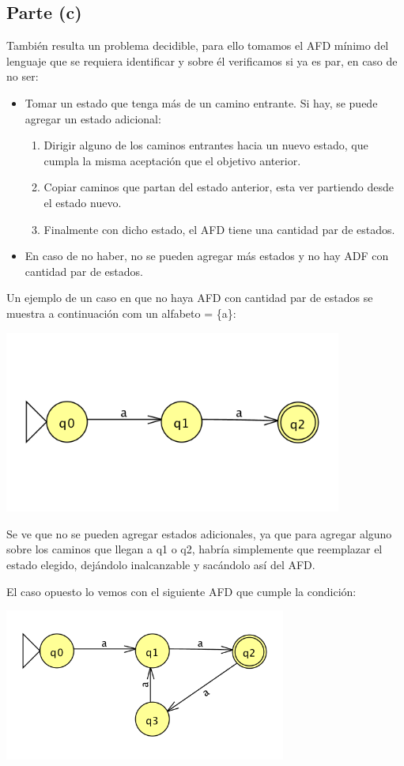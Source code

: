 \documentclass[11pt,letterpaper]{article}
\begin{document}
\subsection{Parte (c)}
También resulta un problema decidible, para ello tomamos el AFD mínimo del lenguaje que se requiera identificar y sobre él verificamos si ya es par, en caso de no ser:
\begin{itemize}
	\item Tomar un estado que tenga más de un camino entrante. Si hay, se puede agregar un estado adicional:
		\begin{enumerate}
			\item Dirigir alguno de los caminos entrantes hacia un nuevo estado, que cumpla la misma aceptación que el objetivo anterior.
			\item Copiar caminos que partan del estado anterior, esta ver partiendo desde el estado nuevo.
			\item Finalmente con dicho estado, el AFD tiene una cantidad par de estados.
		\end{enumerate}
	\item En caso de no haber, no se pueden agregar más estados y no hay ADF con cantidad par de estados.
\end{itemize}

Un ejemplo de un caso en que no haya AFD con cantidad par de estados se muestra a continuación com un alfabeto = \{a\}:
\begin{center}
\includegraphics[height=6cm]{tarea_5-c.png}
\end{center}

Se ve que no se pueden agregar estados adicionales, ya que para agregar alguno sobre los caminos que llegan a q1 o q2, habría simplemente que reemplazar el estado elegido, dejándolo inalcanzable y sacándolo así del AFD.

El caso opuesto lo vemos con el siguiente AFD que cumple la condición:
\begin{center}
\includegraphics[height=5cm]{tarea_5-c2.png}
\end{center}
\end{document}
